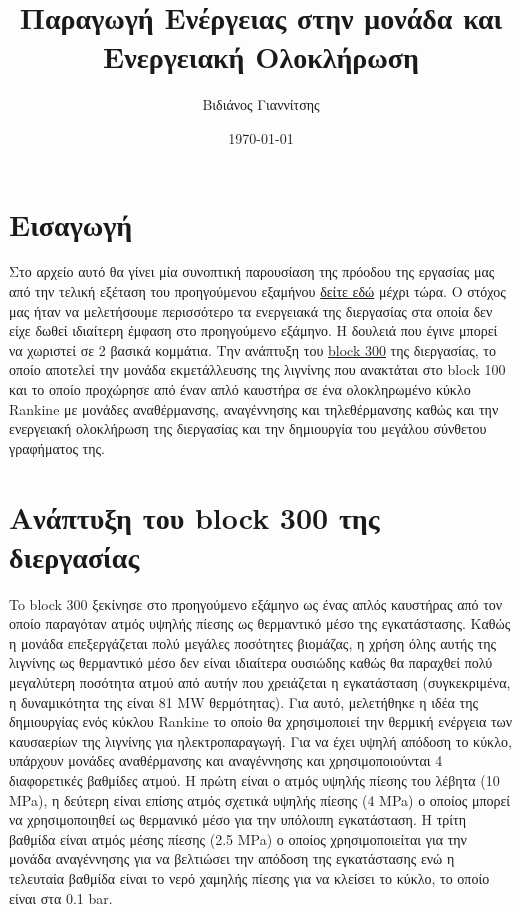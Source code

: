 \documentclass[11pt]{article}
\author{Βιδιάνος Γιαννίτσης}
\date{\today}
\title{Παραγωγή Ενέργειας στην μονάδα και Ενεργειακή Ολοκλήρωση}
\begin{document}
\maketitle
\tableofcontents

\renewcommand{\abstractname}{Περίληψη}
\renewcommand{\tablename}{Πίνακας}
\renewcommand{\figurename}{Σχήμα}
\renewcommand\listingscaption{Κώδικας}

\section{Εισαγωγή}
\label{sec:org642b3db}
Στο αρχείο αυτό θα γίνει μία συνοπτική παρουσίαση της πρόοδου της εργασίας μας από την τελική εξέταση του προηγούμενου εξαμήνου \href{https://github.com/Vidianos-Giannitsis/Process-Design/blob/master/Final\_exam\_files/olive\_kernel\_glycerol\_cyclopentanone\_omada\_27\_final.pdf}{δείτε εδώ} μέχρι τώρα. Ο στόχος μας ήταν να μελετήσουμε περισσότερο τα ενεργειακά της διεργασίας στα οποία δεν είχε δωθεί ιδιαίτερη έμφαση στο προηγούμενο εξάμηνο. Η δουλειά που έγινε μπορεί να χωριστεί σε 2 βασικά κομμάτια. Την ανάπτυξη του \href{https://github.com/Vidianos-Giannitsis/Process-Design/blob/master/Final\_exam\_files/block\_300\_info.pdf}{block 300} της διεργασίας, το οποίο αποτελεί την μονάδα εκμετάλλευσης της λιγνίνης που ανακτάται στο block 100 και το οποίο προχώρησε από έναν απλό καυστήρα σε ένα ολοκληρωμένο κύκλο Rankine με μονάδες αναθέρμανσης, αναγέννησης και τηλεθέρμανσης καθώς και την ενεργειακή ολοκλήρωση της διεργασίας και την δημιουργία του μεγάλου σύνθετου γραφήματος της.

\section{Ανάπτυξη του block 300 της διεργασίας}
\label{sec:org845a65c}
To block 300 ξεκίνησε στο προηγούμενο εξάμηνο ως ένας απλός καυστήρας από τον οποίο παραγόταν ατμός υψηλής πίεσης ως θερμαντικό μέσο της εγκατάστασης. Καθώς η μονάδα επεξεργάζεται πολύ μεγάλες ποσότητες βιομάζας, η χρήση όλης αυτής της λιγνίνης ως θερμαντικό μέσο δεν είναι ιδιαίτερα ουσιώδης καθώς θα παραχθεί πολύ μεγαλύτερη ποσότητα ατμού από αυτήν που χρειάζεται η εγκατάσταση (συγκεκριμένα, η δυναμικότητα της είναι 81 MW θερμότητας). Για αυτό, μελετήθηκε η ιδέα της δημιουργίας ενός κύκλου Rankine το οποίο θα χρησιμοποιεί την θερμική ενέργεια των καυσαερίων της λιγνίνης για ηλεκτροπαραγωγή. Για να έχει υψηλή απόδοση το κύκλο, υπάρχουν μονάδες αναθέρμανσης και αναγέννησης και χρησιμοποιούνται 4 διαφορετικές βαθμίδες ατμού. Η πρώτη είναι ο ατμός υψηλής πίεσης του λέβητα (10 MPa), η δεύτερη είναι επίσης ατμός σχετικά υψηλής πίεσης (4 MPa) ο οποίος μπορεί να χρησιμοποιηθεί ως θερμανικό μέσο για την υπόλοιπη εγκατάσταση. Η τρίτη βαθμίδα είναι ατμός μέσης πίεσης (2.5 MPa) ο οποίος χρησιμοποιείται για την μονάδα αναγέννησης για να βελτιώσει την απόδοση της εγκατάστασης ενώ η τελευταία βαθμίδα είναι το νερό χαμηλής πίεσης για να κλείσει το κύκλο, το οποίο είναι στα 0.1 bar.
\end{document}
